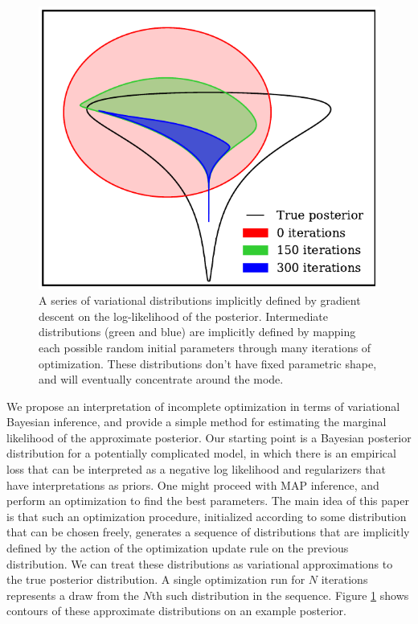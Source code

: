 \documentclass[]{article}
\begin{document}
\begin{figure}[t]
\vskip 0.434in
\begin{center}
\includegraphics[width=\columnwidth]{../experiments/2015_03_02_funnel/2/dists.pdf}
\vskip -0.043in
\caption{A series of variational distributions implicitly defined by gradient descent on the log-likelihood of the posterior.
Intermediate distributions (green and blue) are implicitly defined by mapping each possible random initial parameters through many iterations of optimization.
  These distributions don't have fixed parametric shape, and will eventually concentrate around the mode.}
\label{fig:cartoon}
\end{center}
\end{figure}

We propose an interpretation of incomplete optimization in terms of variational Bayesian inference, and provide a simple method for estimating the marginal likelihood of the approximate posterior.
Our starting point is a Bayesian posterior distribution for a potentially complicated model, in which there is an empirical loss that can be interpreted as a negative log likelihood and regularizers that have interpretations as priors.
One might proceed with MAP inference, and perform an optimization to find the best parameters.
The main idea of this paper is that such an optimization procedure, initialized according to some distribution that can be chosen freely, generates a sequence of distributions that are implicitly defined by the action of the optimization update rule on the previous distribution.
We can treat these distributions as variational approximations to the true posterior distribution.
A single optimization run for $N$ iterations represents a draw from the $N$th such distribution in the sequence.
Figure \ref{fig:cartoon} shows contours of these approximate distributions on an example posterior.
\end{document}
